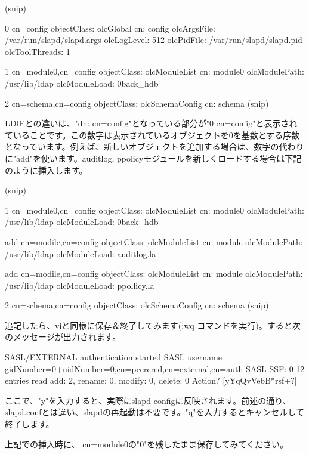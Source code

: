 \documentclass[mingoth,a4paper]{jsarticle}
\begin{document}
\begin{commandline}
(snip)

0 cn=config
objectClass: olcGlobal
cn: config
olcArgsFile: /var/run/slapd/slapd.args
olcLogLevel: 512
olcPidFile: /var/run/slapd/slapd.pid
olcToolThreads: 1

1 cn=module{0},cn=config
objectClass: olcModuleList
cn: module{0}
olcModulePath: /usr/lib/ldap
olcModuleLoad: {0}back_hdb

2 cn=schema,cn=config
objectClass: olcSchemaConfig
cn: schema
(snip)
\end{commandline}

LDIFとの違いは、"dn: cn=config"となっている部分が"0 cn=config"と表示されていることです。この数字は表示されているオブジェクトを0を基数とする序数となっています。例えば、新しいオブジェクトを追加する場合は、数字の代わりに"add"を使います。auditlog, ppolicyモジュールを新しくロードする場合は下記のように挿入します。

\begin{commandline}
(snip)

1 cn=module{0},cn=config
objectClass: olcModuleList
cn: module{0}
olcModulePath: /usr/lib/ldap
olcModuleLoad: {0}back_hdb

add cn=modile,cn=config
objectClass: olcModuleList
cn: module
olcModulePath: /usr/lib/ldap
olcModuleLoad: auditlog.la

add cn=modile,cn=config
objectClass: olcModuleList
cn: module
olcModulePath: /usr/lib/ldap
olcModuleLoad: ppollicy.la

2 cn=schema,cn=config
objectClass: olcSchemaConfig
cn: schema
(snip)
\end{commandline}

追記したら、viと同様に保存＆終了してみます(:wq コマンドを実行)。すると次のメッセージが出力されます。

\begin{commandline}
SASL/EXTERNAL authentication started
SASL username: gidNumber=0+uidNumber=0,cn=peercred,cn=external,cn=auth
SASL SSF: 0
     12 entries read                                                              
add: 2, rename: 0, modify: 0, delete: 0
Action? [yYqQvVebB*rsf+?] 
\end{commandline}

ここで、"y"を入力すると、実際にslapd-configに反映されます。前述の通り、slapd.confとは違い、slapdの再起動は不要です。"q"を入力するとキャンセルして終了します。

上記での挿入時に、 cn=module{0}の"{0}"を残したまま保存してみてください。
\end{document}
